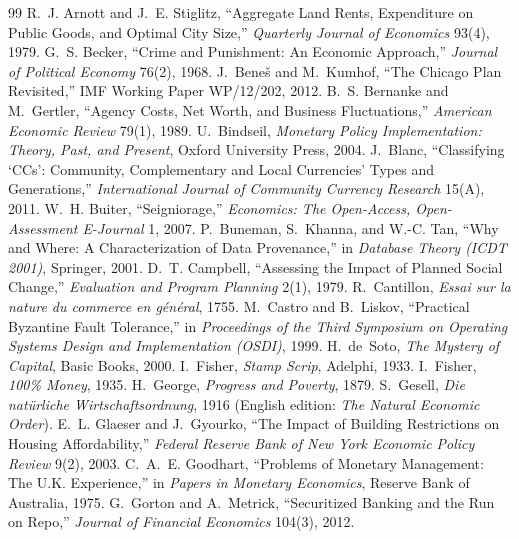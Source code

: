 \documentclass[11pt]{article}
\theoremstyle{definition}
\begin{document}
\begin{thebibliography}{99}
 R.~J. Arnott and J.~E. Stiglitz, ``Aggregate Land Rents, Expenditure on Public Goods, and Optimal City Size,'' \emph{Quarterly Journal of Economics} 93(4), 1979.
 G.~S. Becker, ``Crime and Punishment: An Economic Approach,'' \emph{Journal of Political Economy} 76(2), 1968.
 J.~Bene\v{s} and M.~Kumhof, ``The Chicago Plan Revisited,'' IMF Working Paper WP/12/202, 2012.
 B.~S. Bernanke and M.~Gertler, ``Agency Costs, Net Worth, and Business Fluctuations,'' \emph{American Economic Review} 79(1), 1989.
 U.~Bindseil, \emph{Monetary Policy Implementation: Theory, Past, and Present}, Oxford University Press, 2004.
 J.~Blanc, ``Classifying `CCs': Community, Complementary and Local Currencies' Types and Generations,'' \emph{International Journal of Community Currency Research} 15(A), 2011.
 W.~H. Buiter, ``Seigniorage,'' \emph{Economics: The Open-Access, Open-Assessment E-Journal} 1, 2007.
 P.~Buneman, S.~Khanna, and W.-C. Tan, ``Why and Where: A Characterization of Data Provenance,'' in \emph{Database Theory (ICDT 2001)}, Springer, 2001.
 D.~T. Campbell, ``Assessing the Impact of Planned Social Change,'' \emph{Evaluation and Program Planning} 2(1), 1979.
 R.~Cantillon, \emph{Essai sur la nature du commerce en g\'en\'eral}, 1755.
 M.~Castro and B.~Liskov, ``Practical Byzantine Fault Tolerance,'' in \emph{Proceedings of the Third Symposium on Operating Systems Design and Implementation (OSDI)}, 1999.
 H.~de~Soto, \emph{The Mystery of Capital}, Basic Books, 2000.
 I.~Fisher, \emph{Stamp Scrip}, Adelphi, 1933.
 I.~Fisher, \emph{100\% Money}, 1935.
 H.~George, \emph{Progress and Poverty}, 1879.
 S.~Gesell, \emph{Die nat\"urliche Wirtschaftsordnung}, 1916 (English edition: \emph{The Natural Economic Order}).
 E.~L. Glaeser and J.~Gyourko, ``The Impact of Building Restrictions on Housing Affordability,'' \emph{Federal Reserve Bank of New York Economic Policy Review} 9(2), 2003.
 C.~A.~E. Goodhart, ``Problems of Monetary Management: The U.K. Experience,'' in \emph{Papers in Monetary Economics}, Reserve Bank of Australia, 1975.
 G.~Gorton and A.~Metrick, ``Securitized Banking and the Run on Repo,'' \emph{Journal of Financial Economics} 104(3), 2012.

\end{thebibliography}
\end{document}
